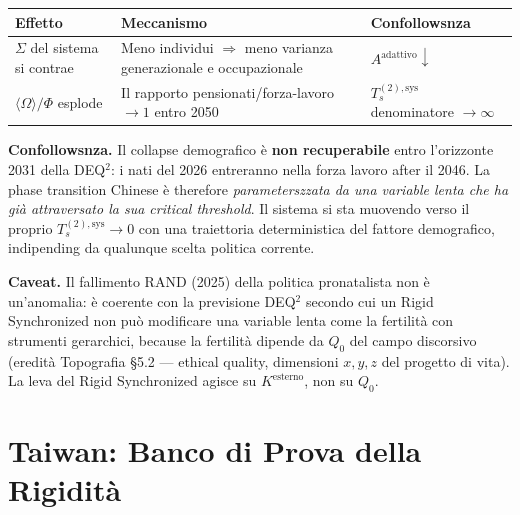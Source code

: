 {\def\LTcaptype{none} %
{\small\begin{longtable}[]{@{}
  >{\raggedright\arraybackslash}p{}
  >{\raggedright\arraybackslash}p{}
  >{\raggedright\arraybackslash}p{}@{}}
\toprule\noalign{}
\begin{minipage}[b]{\linewidth}\raggedright
Effetto
\end{minipage} & \begin{minipage}[b]{\linewidth}\raggedright
Meccanismo
\end{minipage} & \begin{minipage}[b]{\linewidth}\raggedright
Confollowsnza
\end{minipage} \\
\midrule\noalign{}
\endhead
\bottomrule\noalign{}
\endlastfoot
\(\Sigma\) del sistema si contrae & Meno individui \(\Rightarrow\) meno
varianza generazionale e occupazionale &
\(A^{\text{adattivo}} \downarrow\) \\
\(\langle\Omega\rangle / \Phi\) esplode & Il rapporto
pensionati/forza-lavoro \(\to 1\) entro 2050 & \(T_s^{(2),\text{sys}}\)
denominatore \(\to \infty\) \\
\end{longtable}}
}

\Proved{} \textbf{Confollowsnza.} Il collapse demografico è \textbf{non
recuperabile} entro l'orizzonte 2031 della DEQ$^2$: i nati del 2026
entreranno nella forza lavoro after il 2046. La phase transition
Chinese è therefore \emph{parameterszzata da una variable lenta che ha già
attraversato la sua critical threshold}. Il sistema si sta muovendo verso il
proprio \(T_s^{(2),\text{sys}} \to 0\) con una traiettoria
deterministica del fattore demografico, indipending da qualunque scelta
politica corrente.

\Conj{} \textbf{Caveat.} Il fallimento RAND (2025) della politica
pronatalista non è un'anomalia: è coerente con la previsione DEQ$^2$
secondo cui un Rigid Synchronized non può modificare una variable
lenta come la fertilità con strumenti gerarchici, because la fertilità
dipende da \(Q_0\) del campo discorsivo (eredità Topografia \S{}5.2 ---
ethical quality, dimensioni \(x, y, z\) del progetto di vita). La leva del
Rigid Synchronized agisce su \(K^{\text{esterno}}\), non su \(Q_0\).



\section{Taiwan: Banco di Prova della
Rigidità}\label{taiwan-banco-di-prova-della-rigidituxe0}

